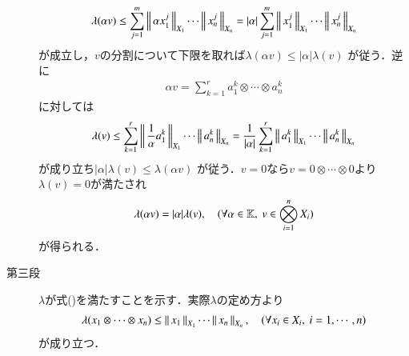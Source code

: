\begin{prf}
\begin{description}
\begin{align}
					\lambda(\alpha v) \leq \sum_{j=1}^m \left\|\, \alpha x^j_1\, \right\|_{X_1} \cdots \left\|\, x^j_n\, \right\|_{X_n}
					= |\alpha| \sum_{j=1}^m \left\|\, x^j_1\, \right\|_{X_1} \cdots \left\|\, x^j_n\, \right\|_{X_n}
				\end{align}
				が成立し，$v$の分割について下限を取れば$\lambda(\alpha v) \leq |\alpha| \lambda(v)$
				が従う．逆に
				\begin{align}
					\alpha v = \sum_{k=1}^r a^k_1 \otimes \cdots \otimes a^k_n
				\end{align}
				に対しては
				\begin{align}
					\lambda(v) \leq \sum_{k=1}^r \left\|\, \frac{1}{\alpha} a^k_1\, \right\|_{X_1} \cdots \left\|\, a^k_n\, \right\|_{X_n}
					= \frac{1}{|\alpha|} \sum_{k=1}^r \left\|\, a^k_1\, \right\|_{X_1} \cdots \left\|\, a^k_n\, \right\|_{X_n}
				\end{align}
				が成り立ち$|\alpha| \lambda(v) \leq \lambda(\alpha v)$
				が従う．$v=0$なら$v = 0 \otimes \cdots \otimes 0$より$\lambda(v) = 0$が満たされ
				\begin{align}
					\lambda(\alpha v) = |\alpha| \lambda(v),
					\quad (\forall \alpha \in \mathbb{K},\ v \in \bigotimes_{i=1}^n X_i)
				\end{align}
				が得られる．
				
			\item[第三段]
				$\lambda$が式()を満たすことを示す．実際$\lambda$の定め方より
				\begin{align}
					\lambda(x_1 \otimes \cdots \otimes x_n) 
					\leq \left\|\, x_1\, \right\|_{X_1} \cdots \left\|\, x_n\, \right\|_{X_n},
					\quad (\forall x_i \in X_i,\ i=1,\cdots,n)
				\end{align}
				が成り立つ．
				

\end{description}
\end{prf}
